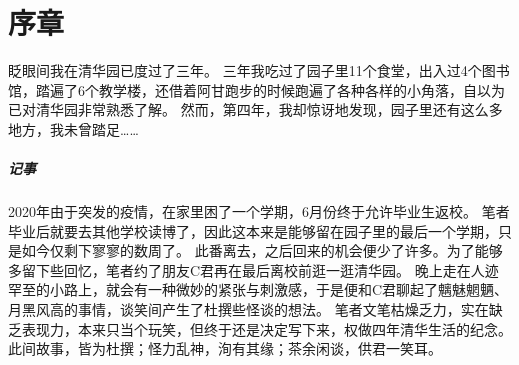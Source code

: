 \chapter{序章}

眨眼间我在清华园已度过了三年。
三年我吃过了园子里11个食堂，出入过4个图书馆，踏遍了6个教学楼，还借着阿甘跑步的时候跑遍了各种各样的小角落，自以为已对清华园非常熟悉了解。
然而，第四年，我却惊讶地发现，园子里还有这么多地方，我未曾踏足……

\vfill

\paragraph{记事}
2020年由于突发的疫情，在家里困了一个学期，6月份终于允许毕业生返校。
笔者毕业后就要去其他学校读博了，因此这本来是能够留在园子里的最后一个学期，只是如今仅剩下寥寥的数周了。
此番离去，之后回来的机会便少了许多。为了能够多留下些回忆，笔者约了朋友C君再在最后离校前逛一逛清华园。
晚上走在人迹罕至的小路上，就会有一种微妙的紧张与刺激感，于是便和C君聊起了魑魅魍魉、月黑风高的事情，谈笑间产生了杜撰些怪谈的想法。
笔者文笔枯燥乏力，实在缺乏表现力，本来只当个玩笑，但终于还是决定写下来，权做四年清华生活的纪念。
此间故事，皆为杜撰；怪力乱神，洵有其缘；茶余闲谈，供君一笑耳。

% 
